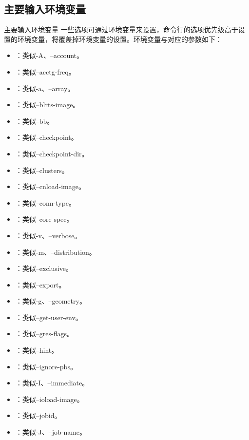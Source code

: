 \subsection{主要输入环境变量}
\begin{frame}[fragile]{主要输入环境变量}
一些选项可通过环境变量来设置，命令行的选项优先级高于设置的环境变量，将覆盖掉环境变量的设置。环境变量与对应的参数如下：
\begin{itemize}
	\item {}：类似-A、--account。
	\item {}：类似--acctg-freq。
	\item {}：类似-a、--array。
	\item {}：类似--blrts-image。
	\item {}：类似--bb。
	\item {}：类似--checkpoint。
	\item {}：类似--checkpoint-dir。
	\item {}：类似--clusters。
	\item {}：类似--cnload-image。
	\item {}：类似--conn-type。
	\item {}：类似--core-spec。
	\item {}：类似-v、--verbose。
	\item {}：类似-m、--distribution。
	\item {}：类似--exclusive。
	\item {}：类似--export。
	\item {}：类似-g、--geometry。
	\item {}：类似--get-user-env。
	\item {}：类似--gres-flags。
	\item {}：类似--hint。
	\item {}：类似--ignore-pbs。
	\item {}：类似-I、--immediate。
	\item {}：类似--ioload-image。
	\item {}：类似--jobid。
	\item {}：类似-J、--job-name。

\end{itemize}
\end{frame}
